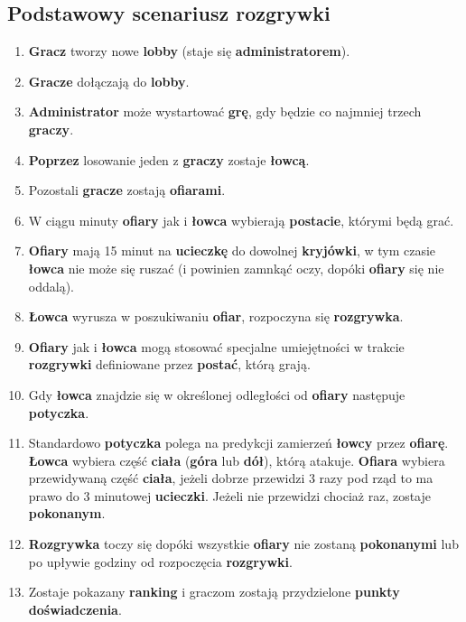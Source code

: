 \documentclass[a4paper,11pt,notitlepage]{article}
\begin{document}
\subsection{Podstawowy scenariusz rozgrywki}
\begin{enumerate}
\item
	\textbf{Gracz} tworzy nowe \textbf{lobby} (staje się \textbf{administratorem}).
	
\item
	\textbf{Gracze} dołączają do \textbf{lobby}.
	
\item
	\textbf{Administrator} może wystartować \textbf{grę}, gdy będzie co najmniej trzech \textbf{graczy}.
	
\item
	\textbf{Poprzez} losowanie jeden z \textbf{graczy} zostaje \textbf{łowcą}.
	
\item
	Pozostali \textbf{gracze} zostają \textbf{ofiarami}.
	
\item
	W ciągu minuty \textbf{ofiary} jak i \textbf{łowca} wybierają \textbf{postacie}, którymi będą grać.
	
\item
	\textbf{Ofiary} mają 15 minut na \textbf{ucieczkę} do dowolnej \textbf{kryjówki}, w tym czasie \textbf{łowca} nie może się ruszać (i powinien zamnkąć oczy, dopóki \textbf{ofiary} się nie oddalą).
	
\item
	\textbf{Łowca} wyrusza w poszukiwaniu \textbf{ofiar}, rozpoczyna się \textbf{rozgrywka}.
	
\item
	\textbf{Ofiary} jak i \textbf{łowca} mogą stosować specjalne umiejętności w trakcie \textbf{rozgrywki} definiowane przez \textbf{postać}, którą grają.
	
\item
	Gdy \textbf{łowca} znajdzie się w określonej odległości od \textbf{ofiary} następuje \textbf{potyczka}.
	
\item
	Standardowo \textbf{potyczka} polega na predykcji zamierzeń \textbf{łowcy} przez \textbf{ofiarę}. \textbf{Łowca} wybiera część \textbf{ciała} (\textbf{góra} lub \textbf{dół}), którą atakuje. \textbf{Ofiara} wybiera przewidywaną część \textbf{ciała}, jeżeli dobrze przewidzi 3 razy pod rząd to ma prawo do 3 minutowej \textbf{ucieczki}. Jeżeli nie przewidzi chociaż raz, zostaje \textbf{pokonanym}.
	
\item
	\textbf{Rozgrywka} toczy się dopóki wszystkie \textbf{ofiary} nie zostaną \textbf{pokonanymi} lub po upływie godziny od rozpoczęcia \textbf{rozgrywki}.
	
\item
	Zostaje pokazany \textbf{ranking} i graczom zostają przydzielone \textbf{punkty doświadczenia}.
	
\end{enumerate}
\end{document}
